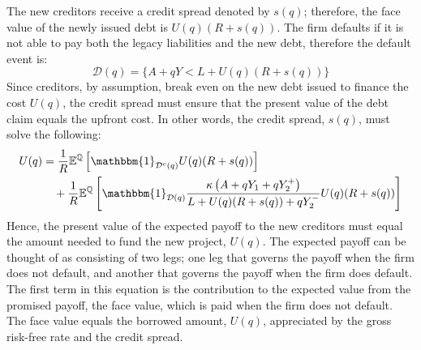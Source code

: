 \documentclass[../main.tex]{subfiles}
\begin{document}
        The new creditors receive a credit spread denoted by $s(q)$;
        therefore, the face value of the newly issued debt is $U(q)(R + s(q))$.
        The firm defaults if it is not able to pay both the legacy liabilities and the new debt,
        therefore the default event is:
            \begin{equation*}
                \mathcal{D}(q)
                = 
                \{
                    A + qY < L + U(q)(R + s(q))
                \}
            \end{equation*}
        Since creditors, by assumption, break even on the new debt issued to finance the cost $U(q)$,
        the credit spread must ensure that the present value of the debt claim equals the upfront cost.
        In other words, the credit spread, $s(q)$, must solve the following:
            \begin{align}
                    U(q) 
                &=
                    \discountfactor
                    \mathbb{E}^{\rnmeasure}\left[
                        \mathbbm{1}_{\mathcal{D}^{c}(q)}
                        U(q)
                        (\grossrfrate + s(q))
                    \right]
                \nonumber \\
                &\quad+
                    \discountfactor
                    \mathbb{E}^{\rnmeasure}\left[
                        \mathbbm{1}_{\mathcal{D}(q)}
                        \frac{
                            \kappa 
                            \left(
                                A + q Y_{1} + q Y_{2}^{+}
                            \right)
                        }{
                            L 
                            +
                            U(q)
                            (\grossrfrate + s(q))
                            +
                            q Y_{2}^{-} 
                        } 
                        U(q)
                        (\grossrfrate + s(q))    
                    \right] 
                \label{eqn:new-creditors-breakeven}
            \end{align}
        Hence, the present value of the expected payoff to the new creditors
        must equal the amount needed to fund the new project, $U(q)$. 
        The expected payoff can be thought of as consisting of two legs;
        one leg that governs the payoff when the firm does not default, 
        and another that governs the payoff when the firm does default.
        \\
        The first term in this equation is the contribution to the expected value from the promised payoff,
        the face value, which is paid when the firm does not default. 
        The face value equals the borrowed amount, $U(q)$, 
        appreciated by the gross risk-free rate and the credit spread.
        
\end{document}
